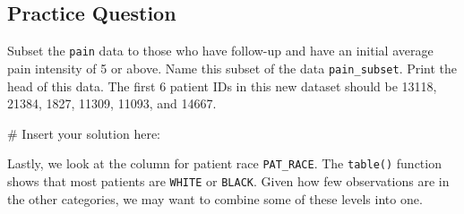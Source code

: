 \documentclass[
  letterpaper,
]{krantz}
\makeatletter
\newenvironment{Shaded}{\begin{snugshade}}{\end{snugshade}}
\newcommand{\CommentTok}[1]{\textcolor[rgb]{0.37,0.37,0.37}{#1}}
\newcommand{\FunctionTok}[1]{\textcolor[rgb]{0.28,0.35,0.67}{#1}}
\newcommand{\NormalTok}[1]{\textcolor[rgb]{0.00,0.23,0.31}{#1}}
\newcommand{\SpecialCharTok}[1]{\textcolor[rgb]{0.37,0.37,0.37}{#1}}
\newenvironment{kframe}{%
\medskip{}
\setlength{\fboxsep}{.8em}
 \def\at@end@of@kframe{}%
 \ifinner\ifhmode%
  \def\at@end@of@kframe{\end{minipage}}%
  \begin{minipage}{\columnwidth}%
 \fi\fi%
 \def\FrameCommand##1{\hskip\@totalleftmargin \hskip-\fboxsep
 \colorbox{shadecolor}{##1}\hskip-\fboxsep
     \hskip-\linewidth \hskip-\@totalleftmargin \hskip\columnwidth}%
 \MakeFramed {\advance\hsize-\width
   \@totalleftmargin\z@ \linewidth\hsize
   \@setminipage}}%
 {\par\unskip\endMakeFramed%
 \at@end@of@kframe}
\renewenvironment{Shaded}{\begin{kframe}}{\end{kframe}}
\makeatother
\begin{document}
\subsection{Practice Question}\label{practice-question-5}

Subset the \texttt{pain} data to those who have follow-up and have an
initial average pain intensity of 5 or above. Name this subset of the
data \texttt{pain\_subset}. Print the head of this data. The first 6
patient IDs in this new dataset should be 13118, 21384, 1827, 11309,
11093, and 14667.

\begin{Shaded}
\begin{Highlighting}[]
\CommentTok{\# Insert your solution here:}
\end{Highlighting}
\end{Shaded}

Lastly, we look at the column for patient race \texttt{PAT\_RACE}. The
\texttt{table()} function shows that most patients are \texttt{WHITE} or
\texttt{BLACK}. Given how few observations are in the other categories,
we may want to combine some of these levels into one.

\begin{Shaded}
\end{Shaded}
\end{document}
